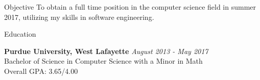 \documentclass{resume} %
\begin{document}
\center

\begin{rSection}{Objective}
To obtain a full time position in the computer science field in summer 2017, utilizing my skills in software engineering.
\end{rSection}
\begin{rSection}{Education}

{\bf Purdue University, West Lafayette} \hfill {\em August 2013 - May 2017} \\ 
Bachelor of Science in Computer Science with a Minor in Math\\
Overall GPA: 3.65/4.00

\end{rSection}

\end{document}
